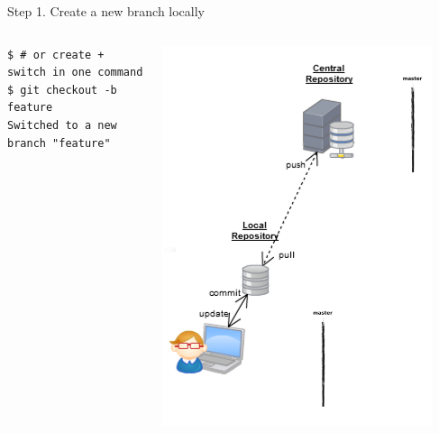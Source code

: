 \begin{frame}[fragile]{Step 1. Create a new branch locally}
\begin{columns}
\begin{column}{0.6\textwidth}
\begin{onlyenv}
\begin{lstlisting}
$ # or create + switch in one command
$ git checkout -b feature 
Switched to a new branch "feature"
  	\end{lstlisting}
  	\end{onlyenv}
  	\end{column}
	\begin{column}{0.4\textwidth}
		\begin{center}
			 {
				\includegraphics[width=0.9\textwidth]{branch_a.png}
			} \only<2-> {
}
\end{center}
\end{column}
\end{columns}
\end{frame}
